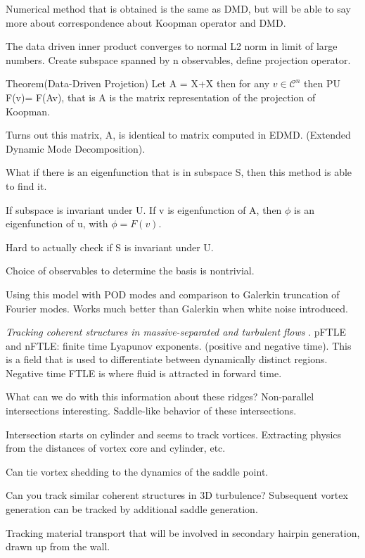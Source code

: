 \begin{description}
{\begin{description}
Numerical method that is obtained is the same as DMD, but will
be able to say more about correspondence about Koopman operator and DMD.

The data driven inner product converges to normal L2 norm in limit of large
numbers.
Create subspace spanned by n observables, define projection operator.

Theorem(Data-Driven Projetion)
Let A = X+X then for any $v \in \mathcal{C}^n$ then
PU F(v)= F(Av), that is A is the matrix representation of the projection of Koopman.

Turns out this matrix, A, is identical to matrix computed in EDMD. (Extended
Dynamic Mode Decomposition).

What if there is an eigenfunction that is in subspace S, then this method
is able to find it.

If subspace is invariant under U. If v is eigenfunction of A, then $\phi$ is
an eigenfunction of u, with $\phi = F(v)$.

Hard to actually check if S is invariant under U.

Choice of observables to determine the basis is nontrivial.

Using this model with POD modes and comparison to Galerkin truncation
of Fourier modes. Works much better than Galerkin when white noise
introduced.

\item[M. Green Talk]
\textit{Tracking coherent structures in massive-separated and turbulent flows}
.
pFTLE and nFTLE: finite time Lyapunov exponents. (positive and negative time).
This is a field that is used to differentiate between dynamically distinct
regions. Negative time FTLE is where fluid is attracted in forward time.

What can we do with this information about these ridges? Non-parallel
intersections interesting. Saddle-like behavior of these intersections.

Intersection starts on cylinder and seems to track vortices.
Extracting physics from the distances of vortex core and cylinder, etc.

Can tie vortex shedding to the dynamics of the saddle point.

Can you track similar coherent structures in 3D turbulence?
Subsequent vortex generation can be tracked by additional saddle
generation.

Tracking material transport that will be involved in secondary hairpin
generation, drawn up from the wall.


\end{description}}
\end{description}
